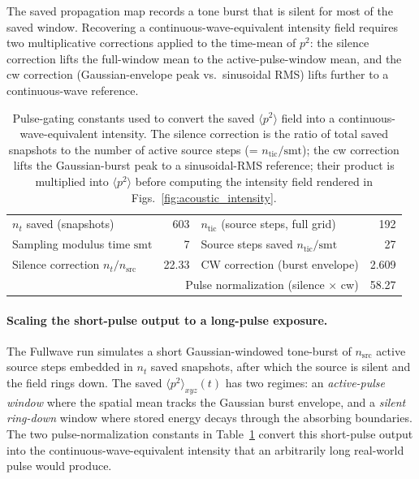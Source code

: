 \documentclass[11pt,letterpaper]{article}
\begin{document}
The saved propagation map records a tone burst that is silent for most
of the saved window.  Recovering a continuous-wave-equivalent intensity
field requires two multiplicative corrections applied to the time-mean
of $p^2$: the silence correction lifts the full-window mean to the
active-pulse-window mean, and the cw correction (Gaussian-envelope
peak vs.\ sinusoidal RMS) lifts further to a continuous-wave reference.

\begin{table}[h!]
\centering
\scriptsize
\setlength{\tabcolsep}{6pt}
\begin{tabular}{lr|lr}
\toprule
$n_t$ saved (snapshots)            & 603                          & $n_{\mathrm{tic}}$ (source steps, full grid) & 192 \\
Sampling modulus time $\mathrm{smt}$ & 7          & Source steps saved $n_{\mathrm{tic}}/\mathrm{smt}$ & 27 \\
Silence correction $n_t / n_{\mathrm{src}}$ & 22.33 & CW correction (burst envelope) & 2.609 \\
\multicolumn{3}{r}{Pulse normalization (silence $\times$ cw)} & 58.27 \\
\bottomrule
\end{tabular}
\caption{Pulse-gating constants used to convert the saved $\langle p^2 \rangle$ field into a continuous-wave-equivalent intensity. The silence correction is the ratio of total saved snapshots to the number of active source steps (= $n_{\mathrm{tic}} / \mathrm{smt}$); the cw correction lifts the Gaussian-burst peak to a sinusoidal-RMS reference; their product is multiplied into $\langle p^2 \rangle$ before computing the intensity field rendered in Figs.~\ref{fig:acoustic_intensity}.}
\label{tab:pulse_norm}
\end{table}

\paragraph{Scaling the short-pulse output to a long-pulse exposure.}
The Fullwave run simulates a short Gaussian-windowed tone-burst of $n_{\mathrm{src}}$ active source steps embedded in $n_t$ saved snapshots, after which the source is silent and the field rings down.  The saved $\langle p^2 \rangle_{xyz}(t)$ has two regimes: an \emph{active-pulse window} where the spatial mean tracks the Gaussian burst envelope, and a \emph{silent ring-down} window where stored energy decays through the absorbing boundaries.  The two pulse-normalization constants in Table~\ref{tab:pulse_norm} convert this short-pulse output into the continuous-wave-equivalent intensity that an arbitrarily long real-world pulse would produce.
\end{document}
